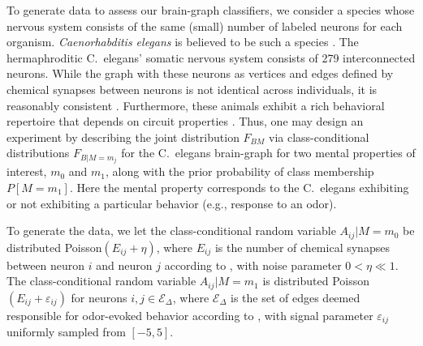 \documentclass{article}
\newcommand{\mE}{\mathcal{E}}
\newcommand{\mED}{\mE_{\Delta}}
\begin{document}
To generate data to assess our brain-graph classifiers, we consider a species whose nervous system consists of the same (small) number of labeled neurons for each organism. {\it Caenorhabditis elegans} is believed to be such a species \cite{Durbin87}. The hermaphroditic C.~elegans' somatic nervous system consists of 279 interconnected neurons. While the graph with these neurons as vertices and edges defined by chemical synapses between neurons is not identical across individuals, it is reasonably consistent \cite{Durbin87}. Furthermore, these animals exhibit a rich behavioral repertoire that depends on circuit properties \cite{deBonoMaricq05}. Thus, one may design an experiment by describing the joint distribution $F_{BM}$ via class-conditional distributions $F_{B|M=m_j}$ for the C.~elegans brain-graph for two mental properties of interest, $m_0$ and $m_1$, along with the prior probability of class membership $P[M=m_1]$. Here the mental property corresponds to the C.~elegans exhibiting or not exhibiting a particular behavior (e.g., response to an odor).

To generate the data, we let the class-conditional random variable $A_{ij} | M=m_0$ be distributed Poisson$(E_{ij}+\eta)$, where $E_{ij}$ is the number of chemical synapses between neuron $i$ and neuron $j$ according to \cite{VarshneyChklovskii09}, with noise parameter $0<\eta \ll 1$. The class-conditional random variable $A_{ij} | M=m_1$ is distributed Poisson$(E_{ij}+ \varepsilon_{ij})$ for neurons $i,j \in \mED$, where $\mED$ is the set of edges deemed responsible for odor-evoked behavior according to \cite{ChalasaniBargmann07}, with signal parameter $\varepsilon_{ij}$ uniformly sampled from $[-5,5]$. %

\end{document}
